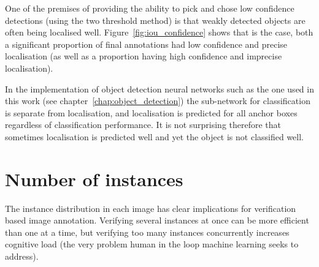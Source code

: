 One of the premises of providing the ability to pick and chose low confidence detections (using the two threshold method) is that weakly detected objects are often being localised well. Figure~\ref{fig:iou_confidence} shows that is the case, both a significant proportion of final annotations had low confidence and  precise localisation (as well as a proportion having high confidence and imprecise localisation).


\begin{table}[h]
\caption{Breakdown by dataset of detections included as an annotation; confident if $ p > 0.7 $, precise if $ IoU > 0.85 $ with respect to final annotation} 
\noindent{}
\label{tab:confidence_precision}
\end{table}

In the implementation of object detection neural networks such as the one used in this work (see chapter~\ref{chap:object_detection}) the sub-network for classification is separate from localisation, and localisation is predicted for all anchor boxes regardless of classification performance. It is not surprising therefore that sometimes localisation is predicted well and yet the object is not classified well.


\section{Number of instances}
\label{sec:instances_discussion}

The instance distribution in each image has clear implications for verification based image annotation. Verifying several instances at once can be more efficient than one at a time, but verifying too many instances concurrently increases cognitive load (the very problem human in the loop machine learning seeks to address). 

